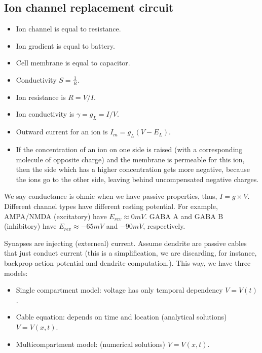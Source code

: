 \documentclass[main]{subfiles}
\begin{document}
\subsection{Ion channel replacement circuit}
\begin{itemize}[noitemsep,nolistsep]
	\item Ion channel is equal to resistance.
	\item Ion gradient is equal to battery.
	\item Cell membrane is equal to capacitor.
	\item Conductivity $S=\frac{1}{R}$.
	\item Ion resistance is $R = V/I$.
	\item Ion conductivity is $\gamma = g_L = I/V$.
	\item Outward current for an ion is $I_m=g_L(V-E_L)$.
	\item If the concentration of an ion on one side is raised (with a corresponding molecule of opposite charge) and the membrane is permeable for this ion, then the side which has a higher concentration gets more negative, because the ions go to the other side, leaving behind uncompensated negative charges.
\end{itemize}
\begin{figure}[H]
	\centering
\end{figure}
\begin{figure}[H]
	\centering
\end{figure}

We say conductance is ohmic when we have passive properties, thus, $I = g \times V$.
Different channel types have different resting potential. For example, AMPA/NMDA (excitatory) have $E_{rev} \approx 0 mV$. GABA A and GABA B (inhibitory) have $E_{rev} \approx -65 mV$ and $-90 mV$, respectively.

Synapses are injecting (externeal) current.
Assume dendrite are passive cables that just conduct current (this is a simplification, we are discarding, for instance, backprop action potential and dendrite computation.). This way, we have three models:
\begin{itemize}
\item Single compartment model: voltage has only temporal dependency $V = V(t)$.
\item Cable equation: depends on time and location (analytical solutions) $V = V(x,t)$.
\item Multicompartment model: (numerical solutions) $V = V(x,t)$.
\end{itemize}
\end{document}
